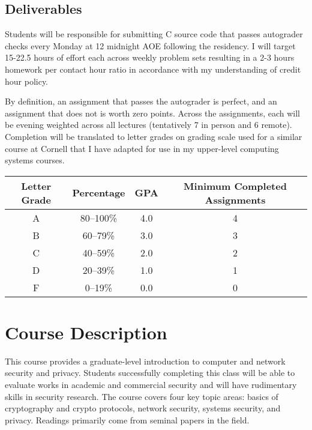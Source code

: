 \documentclass[11pt]{article}
\begin{document}
\subsection*{Deliverables} Students will be responsible for submitting C source code that passes autograder checks every Monday at 12 midnight AOE following the residency. I will target 15-22.5 hours of effort each across weekly problem sets resulting in a 2-3 hours homework per contact hour ratio in accordance with my understanding of credit hour policy.

By definition, an assignment that passes the autograder is perfect, and an assignment that does not is worth zero points. Across the assignments, each will be evening weighted across all lectures (tentatively 7 in person and 6 remote). Completion will be translated to letter grades on grading scale used for a similar course at Cornell that I have adapted for use in my upper-level computing systems courses.

\begin{tabular}{|c|c|c|c|}
\hline
\textbf{Letter Grade} & \textbf{Percentage} & \textbf{GPA} & \textbf{Minimum Completed Assignments} \\
\hline
A & 80--100\% & 4.0 & 4 \\
\hline
B & 60--79\% & 3.0  & 3\\
\hline
C & 40--59\% & 2.0 & 2\\
\hline
D & 20--39\% & 1.0 & 1 \\
\hline
F & 0--19\% & 0.0 & 0 \\
\hline
\end{tabular}


\section*{Course Description}

This course provides a graduate-level introduction to computer and network security and privacy. Students successfully completing this class will be able to evaluate works in academic and commercial security and will have rudimentary skills in security research. The course covers four key topic areas: basics of cryptography and crypto protocols, network security, systems security, and privacy. Readings primarily come from seminal papers in the field. 

\end{document}
